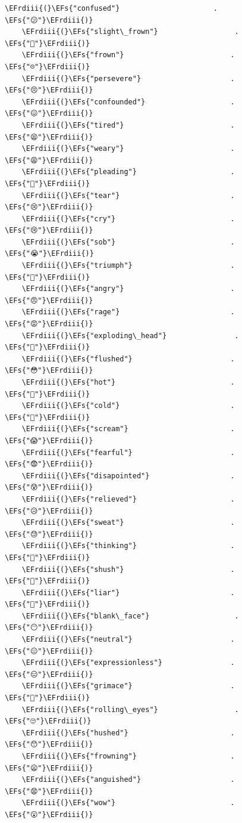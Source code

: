 \documentclass{scrartcl}
\newcommand{\EFs}[1]{\textcolor{EFs}{#1}} %
\newcommand{\EFrdiii}[1]{\textcolor{EFrdiii}{#1}} %
\begin{document}
\begin{Code}
\begin{Verbatim}[]
    \EFrdiii{(}\EFs{"confused"}                      . \EFs{"😕"}\EFrdiii{)}
    \EFrdiii{(}\EFs{"slight\_frown"}                  . \EFs{"🙁"}\EFrdiii{)}
    \EFrdiii{(}\EFs{"frown"}                         . \EFs{"☹️"}\EFrdiii{)}
    \EFrdiii{(}\EFs{"persevere"}                     . \EFs{"😣"}\EFrdiii{)}
    \EFrdiii{(}\EFs{"confounded"}                    . \EFs{"😖"}\EFrdiii{)}
    \EFrdiii{(}\EFs{"tired"}                         . \EFs{"😫"}\EFrdiii{)}
    \EFrdiii{(}\EFs{"weary"}                         . \EFs{"😩"}\EFrdiii{)}
    \EFrdiii{(}\EFs{"pleading"}                      . \EFs{"🥺"}\EFrdiii{)}
    \EFrdiii{(}\EFs{"tear"}                          . \EFs{"😢"}\EFrdiii{)}
    \EFrdiii{(}\EFs{"cry"}                           . \EFs{"😢"}\EFrdiii{)}
    \EFrdiii{(}\EFs{"sob"}                           . \EFs{"😭"}\EFrdiii{)}
    \EFrdiii{(}\EFs{"triumph"}                       . \EFs{"😤"}\EFrdiii{)}
    \EFrdiii{(}\EFs{"angry"}                         . \EFs{"😠"}\EFrdiii{)}
    \EFrdiii{(}\EFs{"rage"}                          . \EFs{"😡"}\EFrdiii{)}
    \EFrdiii{(}\EFs{"exploding\_head"}                . \EFs{"🤯"}\EFrdiii{)}
    \EFrdiii{(}\EFs{"flushed"}                       . \EFs{"😳"}\EFrdiii{)}
    \EFrdiii{(}\EFs{"hot"}                           . \EFs{"🥵"}\EFrdiii{)}
    \EFrdiii{(}\EFs{"cold"}                          . \EFs{"🥶"}\EFrdiii{)}
    \EFrdiii{(}\EFs{"scream"}                        . \EFs{"😱"}\EFrdiii{)}
    \EFrdiii{(}\EFs{"fearful"}                       . \EFs{"😨"}\EFrdiii{)}
    \EFrdiii{(}\EFs{"disapointed"}                   . \EFs{"😰"}\EFrdiii{)}
    \EFrdiii{(}\EFs{"relieved"}                      . \EFs{"😥"}\EFrdiii{)}
    \EFrdiii{(}\EFs{"sweat"}                         . \EFs{"😓"}\EFrdiii{)}
    \EFrdiii{(}\EFs{"thinking"}                      . \EFs{"🤔"}\EFrdiii{)}
    \EFrdiii{(}\EFs{"shush"}                         . \EFs{"🤫"}\EFrdiii{)}
    \EFrdiii{(}\EFs{"liar"}                          . \EFs{"🤥"}\EFrdiii{)}
    \EFrdiii{(}\EFs{"blank\_face"}                    . \EFs{"😶"}\EFrdiii{)}
    \EFrdiii{(}\EFs{"neutral"}                       . \EFs{"😐"}\EFrdiii{)}
    \EFrdiii{(}\EFs{"expressionless"}                . \EFs{"😑"}\EFrdiii{)}
    \EFrdiii{(}\EFs{"grimace"}                       . \EFs{"😬"}\EFrdiii{)}
    \EFrdiii{(}\EFs{"rolling\_eyes"}                  . \EFs{"🙄"}\EFrdiii{)}
    \EFrdiii{(}\EFs{"hushed"}                        . \EFs{"😯"}\EFrdiii{)}
    \EFrdiii{(}\EFs{"frowning"}                      . \EFs{"😦"}\EFrdiii{)}
    \EFrdiii{(}\EFs{"anguished"}                     . \EFs{"😧"}\EFrdiii{)}
    \EFrdiii{(}\EFs{"wow"}                           . \EFs{"😮"}\EFrdiii{)}

\end{Verbatim}
\end{Code}
\end{document}
